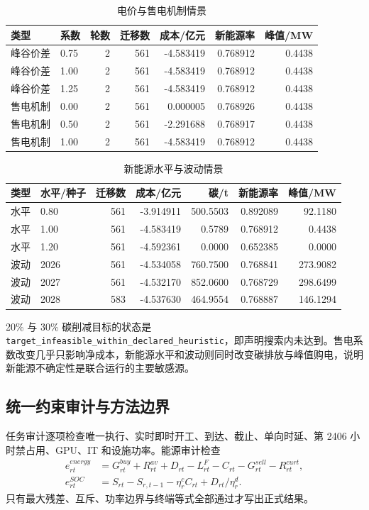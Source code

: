 \begin{table}[H]\centering
{\small
\caption{电价与售电机制情景}\label{tab:q4price}
\begin{tabular}{llrrrrr}\toprule
类型 & 系数 & 轮数 & 迁移数 & 成本/亿元 & 新能源率 & 峰值/MW\\\midrule
峰谷价差 & 0.75 & 2 & 561 & -4.583419 & 0.768912 & 0.4438\\
峰谷价差 & 1.00 & 2 & 561 & -4.583419 & 0.768912 & 0.4438\\
峰谷价差 & 1.25 & 2 & 561 & -4.583419 & 0.768912 & 0.4438\\
售电机制 & 0.00 & 2 & 561 & 0.000005 & 0.768926 & 0.4438\\
售电机制 & 0.50 & 2 & 561 & -2.291688 & 0.768917 & 0.4438\\
售电机制 & 1.00 & 2 & 561 & -4.583419 & 0.768912 & 0.4438\\\bottomrule
\end{tabular}
}
\end{table}

\begin{table}[H]\centering
{\small
\caption{新能源水平与波动情景}\label{tab:q4renewable}
\begin{tabular}{llrrrrr}\toprule
类型 & 水平/种子 & 迁移数 & 成本/亿元 & 碳/t & 新能源率 & 峰值/MW\\\midrule
水平 & 0.80 & 561 & -3.914911 & 500.5503 & 0.892089 & 92.1180\\
水平 & 1.00 & 561 & -4.583419 & 0.5789 & 0.768912 & 0.4438\\
水平 & 1.20 & 561 & -4.592361 & 0.0000 & 0.652385 & 0.0000\\
波动 & 2026 & 561 & -4.534058 & 760.7500 & 0.768841 & 273.9082\\
波动 & 2027 & 561 & -4.532170 & 852.0600 & 0.768729 & 298.6499\\
波动 & 2028 & 583 & -4.537630 & 464.9554 & 0.768887 & 146.1294\\\bottomrule
\end{tabular}
}
\end{table}

20\% 与 30\% 碳削减目标的状态是 \texttt{target\_infeasible\_within\_declared\_heuristic}，即声明搜索内未达到。售电系数改变几乎只影响净成本，新能源水平和波动则同时改变碳排放与峰值购电，说明新能源不确定性是联合运行的主要敏感源。

\subsection{统一约束审计与方法边界}
任务审计逐项检查唯一执行、实时即时开工、到达、截止、单向时延、第 2406 小时禁占用、GPU、IT 和设施功率。能源审计检查
\begin{align}
e^{energy}_{rt}&=G^{buy}_{rt}+R^{av}_{rt}+D_{rt}-L^F_{rt}-C_{rt}-G^{sell}_{rt}-R^{curt}_{rt},\\
e^{SOC}_{rt}&=S_{rt}-S_{r,t-1}-\eta_r^cC_{rt}+D_{rt}/\eta_r^d.
\end{align}
只有最大残差、互斥、功率边界与终端等式全部通过才写出正式结果。

